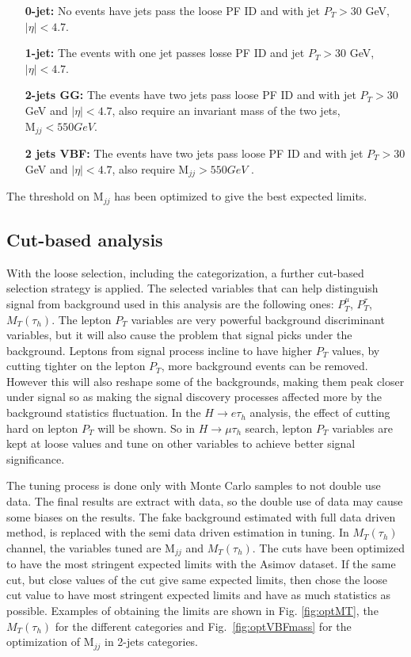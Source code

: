 \begin{enumerate}
\item[{\bf 0-jet:}] No events have jets pass the loose PF ID and  with jet $P_T>30$ GeV, $|\eta|<4.7$.
\item[{\bf 1-jet:}] The events with one jet passes losse PF ID and jet $P_T>30$ GeV, $|\eta|<4.7$.
\item [{\bf 2-jets GG:}] The events have two jets pass loose PF ID and with jet $P_T>30$ GeV and $|\eta|<4.7$, also require an invariant mass of the two jets, $\textrm{M}_{jj}<550GeV$. 
\item [{\bf 2 jets VBF:}] The events have two jets pass loose PF ID and with jet $P_T>30$ GeV and $|\eta|<4.7$, also require $\textrm{M}_{jj}>550 GeV$ . 
\end{enumerate} The threshold on $\textrm{M}_{jj}$ has been optimized to give the best expected limits.


\subsection{Cut-based analysis}
With the loose selection, including the categorization, a further cut-based selection strategy is applied. The selected variables that can help distinguish signal from background used in this analysis are the following ones: $P_{T}^{\mu}$, $P_{T}^{\tau}$, $M_{T}(\tau_{h})$. The lepton $P_{T}$ variables are very powerful background discriminant variables, but it will also cause the problem that signal picks under the background. Leptons from signal process  incline to have higher $P_{T}$ values, by cutting tighter on the lepton $P_{T}$, more background events can be removed. However this will also reshape some of the backgrounds, making them peak closer under signal so as making the signal discovery processes affected more by the background statistics fluctuation. In the $H\rightarrow e\tau_h$ analysis, the effect of cutting hard on lepton $P_{T}$ will be shown. So in $H\rightarrow\mu\tau_h$ search, lepton $P_{T}$ variables are kept at loose values and tune on other variables to achieve better signal significance. 

The tuning process is done only with Monte Carlo samples to not double use data. The final results are extract with data, so the double use of data may cause some biases on the results. The fake background estimated with full data driven method, is replaced with the semi data driven estimation in tuning.  
In $M_{T}(\tau_{h})$  channel, the variables tuned are $\textrm{M}_{jj}$ and $M_{T}(\tau_{h})$. The cuts have been optimized to have the most stringent expected limits with the Asimov dataset. If the same cut, but close values of the cut give same expected limits, then chose the loose cut value to have most stringent expected limits and have as much statistics as possible. Examples of obtaining the limits are shown in Fig. \ref{fig:optMT}, the $M_T(\tau_{h})$ for the different categories and Fig.~\ref{fig:optVBFmass}  for the optimization of $\textrm{M}_{jj}$ in 2-jets categories.


